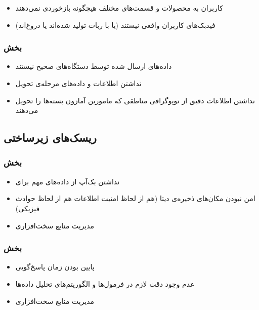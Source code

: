 \begin{itemize}
\item[\risk]
کاربران به محصولات و قسمت‌‌های مختلف هیچگونه بازخوردی نمی‌دهند
\item[\risk]
فید‌بک‌های کاربران واقعی نیستند (یا با ربات تولید شده‌اند یا دروغ‌اند)
\end{itemize}

\subsubsection{بخش }
\begin{itemize}
\item[\risk]
داده‌های ارسال شده توسط دستگاه‌های 
صحیح نیستند
\item[\risk]
نداشتن اطلاعات و داده‌های مرحله‌ی تحویل
\item[\risk] 
نداشتن اطلاعات دقیق از توپوگرافی مناطقی که مامورین آمازون بسته‌ها را تحویل می‌دهند
\end{itemize}

\subsection{ریسک‌های زیرساختی}\label{inf-risk}
\subsubsection{بخش }
\begin{itemize}
\item[\risk]
نداشتن بک‌آپ از داده‌های مهم برای 

\item[\risk]
امن نبودن مکان‌های ذخیره‌ی دیتا (هم از لحاظ‌ امنیت اطلاعات هم از لحاظ حوادث فیزیکی)
\item[\risk]
مدیریت منابع سخت‌افزاری
\end{itemize}

\subsubsection{بخش }
\begin{itemize}
\item[\risk]
پایین بودن زمان پاسخ‌گویی 

\item[\risk]
عدم وجود دقت لازم در فرمول‌ها و الگوریتم‌های تحلیل داده‌ها

\item[\risk]
مدیریت منابع سخت‌افزاری 
\end{itemize}

